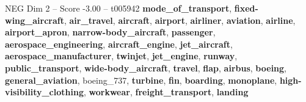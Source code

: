 \begin{textsample}{NEG Dim 2 – Score -3.00 – t005942}  \label{ex:f2_neg_036}
\textbf{mode\_of\_transport}, \textbf{fixed-wing\_aircraft}, \textbf{air\_travel}, \textbf{aircraft}, \textbf{airport}, \textbf{airliner}, \textbf{aviation}, \textbf{airline}, \textbf{airport\_apron}, \textbf{narrow-body\_aircraft}, \textbf{passenger}, \textbf{aerospace\_engineering}, \textbf{aircraft\_engine}, \textbf{jet\_aircraft}, \textbf{aerospace\_manufacturer}, \textbf{twinjet}, \textbf{jet\_engine}, \textbf{runway}, \textbf{public\_transport}, \textbf{wide-body\_aircraft}, \textbf{travel}, \textbf{flap}, \textbf{airbus}, \textbf{boeing}, \textbf{general\_aviation}, boeing\_737, \textbf{turbine}, \textbf{fin}, \textbf{boarding}, \textbf{monoplane}, \textbf{high-visibility\_clothing}, \textbf{workwear}, \textbf{freight\_transport}, \textbf{landing}

\end{textsample}

